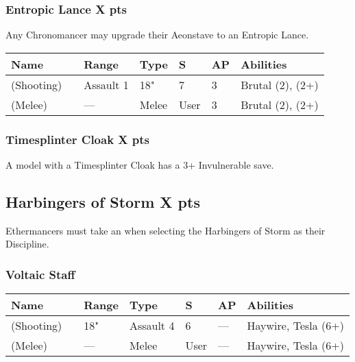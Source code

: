 \subsubsection[Entropic Lance ]{Entropic Lance  \hrulefill X pts} \label{Entropic Lance}

Any Chronomancer may upgrade their Aeonstave to an Entropic Lance.

\noindent
\begin{tabular}{||m{130pt} m{10pt} m{31pt} m{55pt} m{12pt} m{12pt} m{210pt}||}
	\hline
	Name & & Range & Type & S & AP & Abilities \\
	\hline
	\quickref{Entropic Lance} (Shooting) & & Assault 1 & 18" & 7 & 3 & Brutal (2), \quickref{Entropic Strike} (2+) \\
	\quickref{Entropic Lance} (Melee) & & — & Melee & User & 3 & Brutal (2), \quickref{Entropic Strike} (2+) \\
	\hline
\end{tabular}

\subsubsection[Timesplinter Cloak ]{Timesplinter Cloak  \hrulefill X pts}

A model with a Timesplinter Cloak has a 3+ Invulnerable save.


\subsection[Harbingers of Storm ]{Harbingers of Storm  \hrulefill X pts}

Ethermancers must take an  when selecting the Harbingers of Storm as their Discipline.

\subsubsection{Voltaic Staff}
\label{Voltaic Staff}
\noindent
\begin{tabular}{||m{130pt} m{10pt} m{31pt} m{55pt} m{12pt} m{12pt} m{210pt}||}
	\hline
	Name & & Range & Type & S & AP & Abilities \\
	\hline
	\quickref{Voltaic Staff} (Shooting) & & 18" & Assault 4 & 6 & — & Haywire, Tesla (6+) \\
	\quickref{Voltaic Staff} (Melee) & & — & Melee & User & — & Haywire, Tesla (6+) \\
	\hline
\end{tabular}

